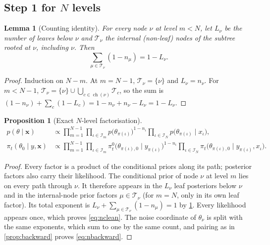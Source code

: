 \documentclass[11pt]{article}
\newtheorem{proposition}[theorem]{Proposition}
\newtheorem{lemma}[theorem]{Lemma}
\theoremstyle{definition}
\theoremstyle{remark}
\newcommand{\X}{\mathbf{x}}
\newcommand{\ch}{\operatorname{ch}}
\begin{document}
\subsection{Step 1 for $N$ levels}

\begin{lemma}[Counting identity]\label{lem:counting}
For every node $\nu$ at level $m<N$, let $L_\nu$ be the number of leaves below
$\nu$ and $\mathcal{T}_\nu$ the internal (non-leaf) nodes of the subtree rooted at
$\nu$, including $\nu$. Then
\begin{equation}\label{eq:counting}
\sum_{\mu\in\mathcal{T}_\nu}(1-n_\mu)=1-L_\nu .
\end{equation}
\end{lemma}
\begin{proof}
Induction on $N-m$. At $m=N-1$, $\mathcal{T}_\nu=\{\nu\}$ and $L_\nu=n_\nu$.
For $m<N-1$, $\mathcal{T}_\nu=\{\nu\}\cup\bigcup_{c\in\ch(\nu)}\mathcal{T}_c$, so
the sum is $(1-n_\nu)+\sum_c(1-L_c)=1-n_\nu+n_\nu-L_\nu=1-L_\nu$.
\end{proof}

\begin{proposition}[Exact $N$-level factorisation]\label{prop:nfactor}
\begin{align}
p(\theta\mid\X)&\propto\prod_{m=1}^{N-1}\prod_{\iota\in\mathcal{I}_m}p\big(\theta_{\pi(\iota)}\big)^{1-n_\iota}\prod_{\iota\in\mathcal{I}_N}p\big(\theta_{\pi(\iota)}\mid x_\iota\big),\label{eq:nclean}\\
\pi_t(\theta_0\mid y,\X)&\propto\prod_{m=1}^{N-1}\prod_{\iota\in\mathcal{I}_m}\pi^0_t\big(\theta_{\pi(\iota),0}\mid y_{\pi(\iota)}\big)^{1-n_\iota}\prod_{\iota\in\mathcal{I}_N}\pi_t\big(\theta_{\pi(\iota),0}\mid y_{\pi(\iota)},x_\iota\big).\label{eq:nbackward}
\end{align}
\end{proposition}
\begin{proof}
Every factor is a product of the conditional priors along its path; posterior
factors also carry their likelihood. The conditional prior of node $\nu$ at level
$m$ lies on every path through $\nu$. It therefore appears in the $L_\nu$ leaf
posteriors below $\nu$ and in the internal-node prior factors $\mu\in\mathcal{T}_\nu$
(for $m=N$, only in its own leaf factor). Its total exponent is
$L_\nu+\sum_{\mu\in\mathcal{T}_\nu}(1-n_\mu)=1$ by \cref{lem:counting}. Every
likelihood appears once, which proves \eqref{eq:nclean}. The noise coordinate of
$\theta_\nu$ is split with the same exponents, which sum to one by the same count,
and pairing as in \cref{prop:backward} proves \eqref{eq:nbackward}.
\end{proof}
\end{document}
